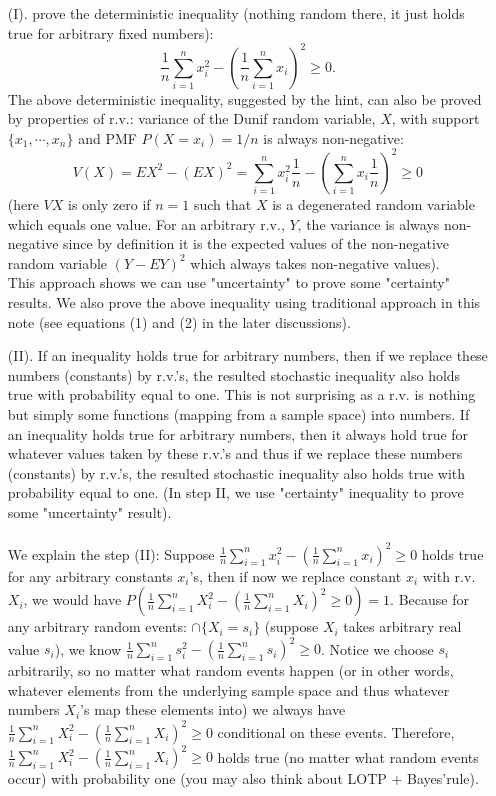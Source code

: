 \begin{exercise} [BH.6.12]
\begin{solution}
\begin{enumerate}
{		\begin{enumerate}
			\item[(I).] prove the deterministic inequality (nothing random there, it just holds true for arbitrary fixed numbers): $$\frac{1}{n}\sum_{i=1}^n  x_i^2  -  ( \frac{1}{n}\sum_{i=1}^n  x_i )^2 \geq 0.$$ 
			The above deterministic inequality, suggested by the hint, can also be proved by properties of r.v.: variance of the Dunif random variable, $X$, with support $\{x_1,\cdots, x_n\}$ and PMF $P(X=x_i)=1/n$ is always non-negative: $$V(X)=EX^2 -(EX)^2=\sum_{i=1}^n  x_i^2  \frac{1}{n}-   ( \sum_{i=1}^n  x_i \frac{1}{n})^2 \geq 0$$ (here $VX$ is only zero if $n=1$ such that $X$ is a degenerated random variable which equals one value. For an arbitrary r.v., $Y$, the variance is always non-negative since by definition it is the expected values of the non-negative random variable $(Y-EY)^2$ which always takes non-negative values).\\
			{  This approach shows we can use "uncertainty" to prove some "certainty" results.}
			We also prove the above inequality using traditional approach in this note (see equations (1) and (2) in the later discussions).
			\item[(II).] If an inequality holds true for arbitrary numbers, then if we replace these numbers (constants) by r.v.'s, the resulted stochastic inequality also holds true with probability equal to one. This is not surprising as a r.v. is nothing but simply some functions (mapping from a sample space) into numbers.  If an inequality holds true for arbitrary numbers, then it always hold true for whatever values taken by these r.v.'s and thus  if we replace these numbers (constants) by r.v.'s, the resulted stochastic inequality also holds true with probability equal to one. (In step II, {  we use "certainty" inequality to prove some "uncertainty" result}).\\~\\
			We explain the step (II): Suppose $\frac{1}{n}\sum_{i=1}^n  x_i^2  -  ( \frac{1}{n}\sum_{i=1}^n  x_i )^2 \geq 0$  holds true for any arbitrary constants $x_i$'s, then if now we replace constant $x_i$ with r.v. $X_i$, we would have $P\left(\frac{1}{n}\sum_{i=1}^n  X_i^2  -  ( \frac{1}{n}\sum_{i=1}^n  X_i )^2 \geq 0 \right)=1$.
			Because for any arbitrary random events: $\cap \{X_i=s_i\}$ (suppose $X_i$ takes arbitrary real value $s_i$), we know $\frac{1}{n}\sum_{i=1}^n  s_i^2  -  ( \frac{1}{n}\sum_{i=1}^n  s_i )^2 \geq 0$. Notice we choose $s_i$ arbitrarily, so no matter what random events happen (or in other words, whatever elements from the underlying sample space and thus whatever numbers $X_i$'s map these elements into) we always have $\frac{1}{n}\sum_{i=1}^n  X_i^2  -  ( \frac{1}{n}\sum_{i=1}^n  X_i )^2 \geq 0$ conditional on these events.  Therefore, $\frac{1}{n}\sum_{i=1}^n  X_i^2  -  ( \frac{1}{n}\sum_{i=1}^n  X_i )^2 \geq 0$ holds true (no matter what random events occur) with probability one (you may also think about LOTP + Bayes'rule).
		\end{enumerate}}
	

\end{enumerate}
\end{solution}
\end{exercise}
